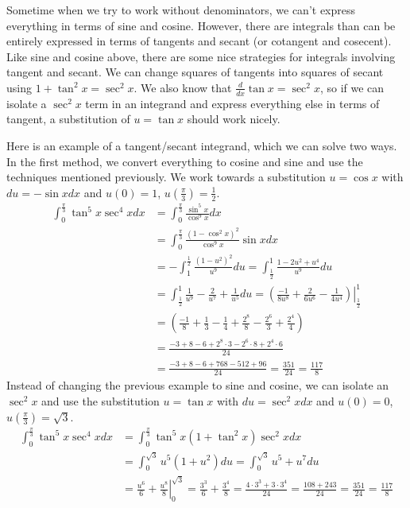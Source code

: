 \documentclass[fleqn]{report}
\begin{document}
Sometime when we try to work without denominators, we can't
express everything in terms of sine and cosine. However,
there are integrals than can be entirely expressed in terms of
tangents and secant (or cotangent and cosecent). Like sine
and cosine above, there are some nice strategies for integrals
involving tangent and secant. We can change squares of
tangents into squares of secant using $1 + \tan^2 x = \sec^2
x$. We also know that $\frac{d}{dx} \tan x = \sec^2 x$, so if
we can isolate a $\sec^2 x$ term in an integrand and express
everything else in terms of tangent, a substitution of $u =
\tan x$ should work nicely. 

\begin{example}
Here is an example of a tangent/secant integrand, which we can
solve two ways. In the first method, we convert everything to
cosine and sine and use the techniques mentioned previously.
We work towards a substitution $u = \cos x$ with $du = -\sin x
dx$ and $u(0) = 1$, $u(\frac{\pi}{3}) = \frac{1}{2}$. 
\begin{align*}
\int_0^{\frac{\pi}{3}} \tan^5 x \sec^4 x dx & = 
\int_0^{\frac{\pi}{3}} \frac{\sin^5 x}{\cos^{9} x} dx \\
& = \int_0^{\frac{\pi}{3}} \frac{(1-\cos^2 x)^2}{\cos^{9} x}
\sin x dx \\
& = -\int_1^{\frac{1}{2}} \frac{(1-u^2)^2}{u^{9}} du =
\int_{\frac{1}{2}}^1 \frac{1 - 2u^2 + u^4}{u^{9}} du \\
& = \int_{\frac{1}{2}}^1 \frac{1}{u^{9}} - \frac{2}{u^7} +
\frac{1}{u^5} du = \left. \left( \frac{-1}{8u^{8}} +
\frac{2}{6u^6} - \frac{1}{4u^4} \right) \right|_{\frac{1}{2}}^1
\\
& = \left( \frac{-1}{8} + \frac{1}{3} - \frac{1}{4} +
\frac{2^{8}}{8} - \frac{2^6}{3} + \frac{2^4}{4} \right) \\
& = \frac{-3+8-6+2^{8}\cdot 3 - 2^6 \cdot 8 + 2^4 \cdot
6}{24} \\
& = \frac{-3+8-6+768-512+96}{24} = \frac{351}{24} =
\frac{117}{8}
\end{align*}
Instead of changing the previous example to sine and cosine,
we can isolate an $\sec^2 x$ and use the substitution $u =
\tan x$ with $du = \sec^2 x dx$ and $u(0) = 0$,
$u\left(\frac{\pi}{3} \right) = \sqrt{3}$. 
\begin{align*}
\int_0^{\frac{\pi}{3}} \tan^5 x \sec^4 x dx & = 
\int_0^{\frac{\pi}{3}} \tan^5 x (1 + \tan^2 x) \sec^2 x dx \\
& = \int_0^{\sqrt{3}} u^5 (1+u^2) du = \int_0^{\sqrt{3}} u^5 +
u^7 du \\
& = \left. \frac{u^6}{6} + \frac{u^8}{8}
\right|_0^{\sqrt{3}} = \frac{3^3}{6} + \frac{3^4}{8} 
= \frac{4\cdot 3^3 + 3\cdot 3^4}{24} = \frac{108 + 243}{24} =
\frac{351}{24} = \frac{117}{8}
\end{align*}
\end{example}
\end{document}
